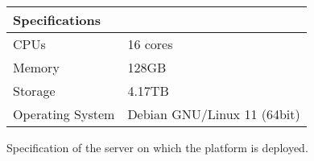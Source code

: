 \begin{figure}[tbph]
	\centering
	\begin{tabular}{ll}
		\toprule
		\textbf{Specifications} &                             \\ \midrule
		CPUs                    & 16 cores                    \\ \midrule
		Memory                  & 128GB                       \\ \midrule
		Storage                 & 4.17TB                      \\ \midrule
		Operating System        & Debian GNU/Linux 11 (64bit) \\ \bottomrule
	\end{tabular}
	\caption{Specification of the server on which the platform is deployed.}
	\label{fig:vm_specs}
\end{figure}


	